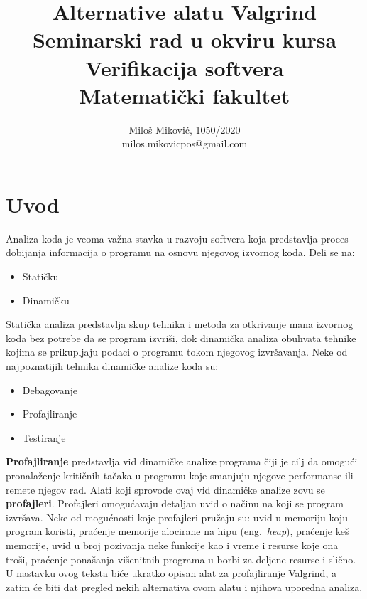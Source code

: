 \documentclass[a4paper]{article}
\begin{document}
\title{Alternative alatu Valgrind\\ \small{Seminarski rad u okviru kursa\\Verifikacija softvera\\ Matematički fakultet}}

\author{Miloš Miković, 1050/2020\\ milos.mikovicpos@gmail.com}
\maketitle


\tableofcontents

\newpage

\section{Uvod}
\label{sec:uvod}
Analiza koda je veoma važna stavka u razvoju softvera koja predstavlja proces dobijanja
informacija o programu na osnovu njegovog izvornog koda.\cite{analizaKoda} Deli se na:
\begin{itemize}
    \item Statičku
    \item Dinamičku
\end{itemize}
Statička analiza predstavlja skup tehnika i metoda za otkrivanje mana izvornog koda bez potrebe da se program izvriši, dok dinamička analiza obuhvata tehnike kojima se prikupljaju podaci o programu tokom njegovog izvršavanja. Neke od najpoznatijih tehnika dinamičke analize koda su:
\begin{itemize}
    \item Debagovanje
    \item Profajliranje
    \item Testiranje
\end{itemize}
\textbf{Profajliranje} predstavlja vid dinamičke analize programa čiji je cilj da omogući pronalaženje kritičnih tačaka u programu koje smanjuju njegove performanse ili remete njegov rad. Alati koji sprovode ovaj vid dinamičke analize zovu se \textbf{profajleri}. Profajleri omogućavaju detaljan uvid o načinu na koji se program izvršava. Neke od mogućnosti koje profajleri pružaju su: uvid u memoriju koju program koristi, praćenje memorije alocirane na hipu (eng.~{\em heap}), praćenje keš memorije, uvid u broj pozivanja neke funkcije kao i vreme i resurse koje ona troši, praćenje ponašanja višenitnih programa u borbi za deljene resurse i slično. U nastavku ovog teksta biće ukratko opisan alat za profajliranje Valgrind, a zatim će biti dat pregled nekih alternativa ovom alatu i njihova uporedna analiza.   
\end{document}
